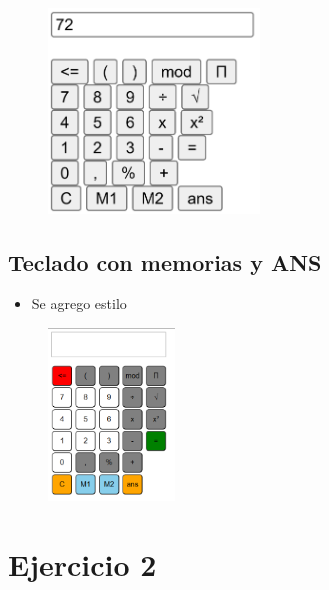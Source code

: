\documentclass{article}
\begin{document}
	\begin{figure}[H]
		\centering
		\includegraphics[width=0.5\textwidth,keepaspectratio]{img/calc07.png}
	\end{figure}
	\subsection{Teclado con memorias y ANS}
	\begin{itemize}	
		\item Se agrego estilo
	\end{itemize}
	
	\begin{figure}[H]
		\centering
		\includegraphics[width=0.3\textwidth,keepaspectratio]{img/cacl-final.png}
	\end{figure}
	\section{Ejercicio 2}
\end{document}

